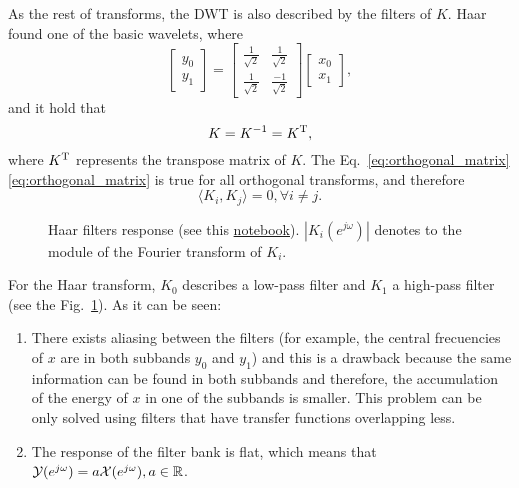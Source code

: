 As the rest of transforms, the DWT is also described by the filters of
$K$. Haar found one of the basic wavelets, where
\begin{equation}
  \begin{bmatrix}
    y_0 \\
    y_1
  \end{bmatrix}
  = 
  \begin{bmatrix} \frac{1}{\sqrt{2}} & \frac{1}{\sqrt{2}} \\ \frac{1}{\sqrt{2}} & \frac{-1}{\sqrt{2}} \end{bmatrix}
  \begin{bmatrix}
    x_0 \\
    x_1
  \end{bmatrix},
  \label{eq:Haar_transform}
\end{equation}
and it hold that
\begin{equation}
  K=K^{-1}=K^{\text T},
  \label{eq:orthogonal_matrix}
\end{equation}
where $K^{\text T}$ represents the transpose matrix of $K$. The
Eq.~\ref{eq:orthogonal_matrix} \ref{eq:orthogonal_matrix} is true for all orthogonal transforms,
and therefore
\begin{equation}
  \langle K_i, K_j\rangle = 0, \forall i\neq j.
\end{equation}

\begin{figure}
  \centering
  \caption{Haar filters response (see this
    \href{}{notebook}). $|K_i(e^{j\omega})|$ denotes to the
    module of the Fourier transform of $K_i$.}
  \label{fig:haar_filters_response}
\end{figure}

For the Haar transform, $K_0$ describes a low-pass filter and $K_1$ a
high-pass filter (see the Fig.~\ref{fig:haar_filters_response}). As it can be seen:
\begin{enumerate}
\item There exists aliasing between the filters (for example, the
  central frecuencies of $x$ are in both subbands $y_0$ and $y_1$) and
  this is a drawback because the same information can be found in both
  subbands and therefore, the accumulation of the energy of $x$ in one
  of the subbands is smaller. This problem can be only solved using
  filters that have transfer functions overlapping less.
\item The response of the filter bank is flat, which means that
  ${\cal Y}(e^{j\omega})=a{\cal X}(e^{j\omega}), a\in\mathbb{R}$.
\end{enumerate}

